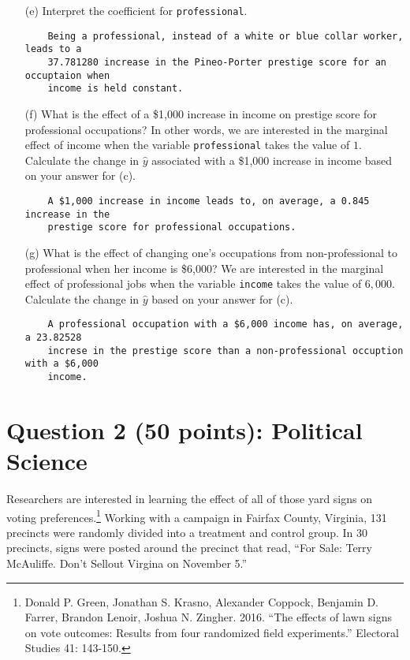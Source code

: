 \documentclass[12pt,letterpaper]{article}
\begin{document}
\begin{enumerate}
	\item [(e)]
	Interpret the coefficient for \texttt{professional}.
	\begin{verbatim}
	Being a professional, instead of a white or blue collar worker, leads to a 
	37.781280 increase in the Pineo-Porter prestige score for an occuptaion when 
	income is held constant.
	\end{verbatim}
	
	\newpage
	\item [(f)]
	What is the effect of a \$1,000 increase in income on prestige score for professional occupations? In other words, we are interested in the marginal effect of income when the variable \texttt{professional} takes the value of $1$. Calculate the change in $\hat{y}$ associated with a \$1,000 increase in income based on your answer for (c).
	
	\begin{verbatim}
	A $1,000 increase in income leads to, on average, a 0.845 increase in the 
	prestige score for professional occupations.
	\end{verbatim}
	
	\item [(g)]
	What is the effect of changing one's occupations from non-professional to professional when her income is \$6,000? We are interested in the marginal effect of professional jobs when the variable \texttt{income} takes the value of $6,000$. Calculate the change in $\hat{y}$ based on your answer for (c).
	
	\begin{verbatim}
	A professional occupation with a $6,000 income has, on average, a 23.82528 
	increse in the prestige score than a non-professional occuption with a $6,000
	income. 
	\end{verbatim}
	
\end{enumerate}

\newpage

\section*{Question 2 (50 points): Political Science}
\vspace{.25cm}
\noindent 	Researchers are interested in learning the effect of all of those yard signs on voting preferences.\footnote{Donald P. Green, Jonathan	S. Krasno, Alexander Coppock, Benjamin D. Farrer,	Brandon Lenoir, Joshua N. Zingher. 2016. ``The effects of lawn signs on vote outcomes: Results from four randomized field experiments.'' Electoral Studies 41: 143-150. } Working with a campaign in Fairfax County, Virginia, 131 precincts were randomly divided into a treatment and control group. In 30 precincts, signs were posted around the precinct that read, ``For Sale: Terry McAuliffe. Don't Sellout Virgina on November 5.'' \\
\end{document}
